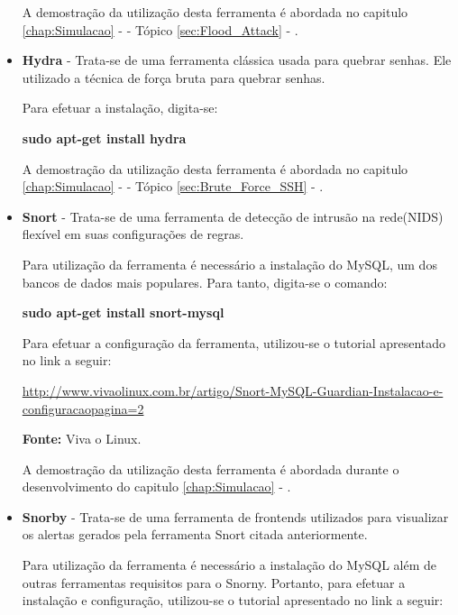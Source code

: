 \begin{itemize}
				A demostração da utilização desta ferramenta é abordada no capitulo \ref{chap:Simulacao} -  - Tópico \ref{sec:Flood_Attack} - .


				\item \textbf{Hydra} - Trata-se de uma ferramenta clássica usada para quebrar senhas. Ele utilizado a técnica de força bruta para quebrar senhas.

				Para efetuar a instalação, digita-se:
				\begin{framed}
					\textbf{sudo apt-get install hydra}
				\end{framed}

				A demostração da utilização desta ferramenta é abordada no capitulo \ref{chap:Simulacao} -  - Tópico \ref{sec:Brute_Force_SSH} - .


				\item \textbf{Snort} - Trata-se de uma ferramenta de detecção de intrusão na rede(NIDS) flexível em suas configurações de regras.

				Para utilização da ferramenta é necessário a instalação do MySQL, um dos bancos de dados mais populares. Para tanto, digita-se o comando:
				\begin{framed}
					\textbf{sudo apt-get install snort-mysql}
				\end{framed}

				Para efetuar a configuração da ferramenta, utilizou-se o tutorial apresentado no link a seguir:

				\begin{framed}
					\href{http://www.vivaolinux.com.br/artigo/Snort-MySQL-Guardian-Instalacao-e-configuracao?pagina=2}{http://www.vivaolinux.com.br/artigo/Snort-MySQL-Guardian-Instalacao-e-configuracao\?pagina=2}
				\end{framed}
				\textbf{Fonte:} Viva o Linux.

				A demostração da utilização desta ferramenta é abordada durante o desenvolvimento do capitulo \ref{chap:Simulacao} - .


				\item \textbf{Snorby} - Trata-se de uma ferramenta de frontends utilizados para visualizar os alertas gerados pela ferramenta Snort citada anteriormente.

				Para utilização da ferramenta é necessário a instalação do MySQL além de outras ferramentas requisitos para o Snorny. Portanto, para efetuar a instalação e configuração, utilizou-se o tutorial apresentado no link a seguir:


\end{itemize}
